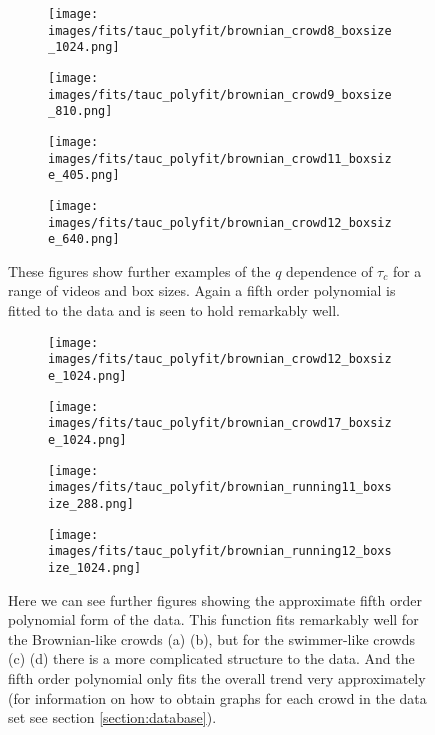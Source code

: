 \documentclass[10pt]{article}
\begin{document}
\begin{figure}[H]
\begin{subfigure}[t]{.5\textwidth}
  \centering
 \texttt{[image: images/fits/tauc\_polyfit/brownian\_crowd8\_boxsize\_1024.png]}
  \caption{}
\end{subfigure}%
\hfill
\begin{subfigure}[t]{.5\textwidth}
  \centering
  \texttt{[image: images/fits/tauc\_polyfit/brownian\_crowd9\_boxsize\_810.png]}
  \caption{}
\end{subfigure}
\par\bigskip
\begin{subfigure}[t]{.5\textwidth}
  \centering
 \texttt{[image: images/fits/tauc\_polyfit/brownian\_crowd11\_boxsize\_405.png]}
  \caption{}
\end{subfigure}%
\hfill
\begin{subfigure}[t]{.5\textwidth}
  \centering
  \texttt{[image: images/fits/tauc\_polyfit/brownian\_crowd12\_boxsize\_640.png]}
  \caption{}
\end{subfigure}
\caption{These figures show further examples of the $q$ dependence of $\tau_c$ for a range of videos and box sizes. Again a fifth order polynomial is fitted to the data and is seen to hold remarkably well.}
\label{fig:tauc_polyfit2}
\end{figure}

\begin{figure}[H]
\begin{subfigure}[t]{.5\textwidth}
  \centering
 \texttt{[image: images/fits/tauc\_polyfit/brownian\_crowd12\_boxsize\_1024.png]}
  \caption{}
\end{subfigure}%
\hfill
\begin{subfigure}[t]{.5\textwidth}
  \centering
  \texttt{[image: images/fits/tauc\_polyfit/brownian\_crowd17\_boxsize\_1024.png]}
  \caption{}
\end{subfigure}
\par\bigskip
\begin{subfigure}[t]{.5\textwidth}
  \centering
 \texttt{[image: images/fits/tauc\_polyfit/brownian\_running11\_boxsize\_288.png]}
  \caption{}
\end{subfigure}%
\hfill
\begin{subfigure}[t]{.5\textwidth}
  \centering
  \texttt{[image: images/fits/tauc\_polyfit/brownian\_running12\_boxsize\_1024.png]}
  \caption{}
\end{subfigure}
\caption{Here we can see further figures showing the approximate fifth order polynomial form of the data. This function fits remarkably well for the Brownian-like crowds (a) (b), but for the swimmer-like crowds (c) (d) there is a more complicated structure to the data. And the fifth order polynomial only fits the overall trend very approximately (for information on how to obtain graphs for each crowd in the data set see section \ref{section:database}).}
\label{fig:tauc_polyfit3}
\end{figure}
\end{document}
